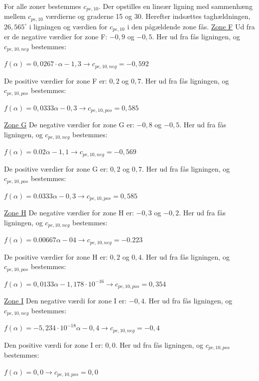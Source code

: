 For alle zoner bestemmes $c_{pe,10}$. Der opstilles en lineær ligning med sammenhæng mellem $c_{pe,10}$ værdierne og graderne 15 og 30. Herefter indsættes taghældningen, $26,\!565^{\circ}$ i ligningen og værdien for $c_{pe,10}$ i den pågældende zone fås.
\newline
\newline
\underline{Zone F}
\newline
Ud fra \citep[ tabel 7.4a kapitel 7.2.5]{EU91} er de negative værdier for zone F: $-0,\!9$ og $-0,\!5$. Her ud fra fås ligningen, og $c_{pe,10,neg}$ bestemmes:
\begin{center}
	$f(\alpha)=0,\!0267\cdot \alpha - 1,\!3 \to c_{pe,10,neg}=-0,\!592$
\end{center}
De positive værdier for zone F er: $0,\!2$ og $0,\!7$. Her ud fra fås ligningen, og $c_{pe,10,pos}$ bestemmes:
\begin{center}
	$f(\alpha)=0,\!0333\alpha - 0,\!3 \to c_{pe,10,pos}=0,\!585$
\end{center}

\underline{Zone G}
\newline
De negative værdier for zone G er: $-0,\!8$ og $-0,\!5$. Her ud fra fås ligningen, og $c_{pe,10,neg}$ bestemmes:
\begin{center}
	$f(\alpha)=0.02\alpha - 1,\!1 \to c_{pe,10,neg}=-0,\!569$
\end{center}
De positive værdier for zone G er: $0,\!2$ og $0,\!7$. Her ud fra fås ligningen, og $c_{pe,10,pos}$ bestemmes:
\begin{center}
	$f(\alpha)=0.0333\alpha - 0,\!3 \to c_{pe,10,pos}=0,\!585$
\end{center}

\underline{Zone H}
\newline
De negative værdier for zone H er: $-0,\!3$ og $-0,\!2$. Her ud fra fås ligningen, og $c_{pe,10,neg}$ bestemmes:
\begin{center}
	$f(\alpha)=0.00667\alpha - 0\!4 \to c_{pe,10,neg}=-0.223$
\end{center}
De positive værdier for zone H er: $0,\!2$ og $0,\!4$. Her ud fra fås ligningen, og $c_{pe,10,pos}$ bestemmes:
\begin{center}
	$f(\alpha)=0,\!0133\alpha - 1,\!178\cdot 10^{-16} \to c_{pe,10,pos}=0,\!354$
\end{center}

\underline{Zone I}
\newline
Den negative værdi for zone I er: $-0,\!4$. Her ud fra fås ligningen, og $c_{pe,10,neg}$ bestemmes:
\begin{center}
	$f(\alpha)=-5,\!234\cdot 10^{-18}\alpha - 0,\!4 \to c_{pe,10,neg}=-0,\!4$
\end{center}
Den positive værdi for zone I er: $0,\!0$. Her ud fra fås ligningen, og $c_{pe,10,pos}$ bestemmes:
\begin{center}
	$f(\alpha)=0,\!0 \to c_{pe,10,pos}=0,\!0$
\end{center}

